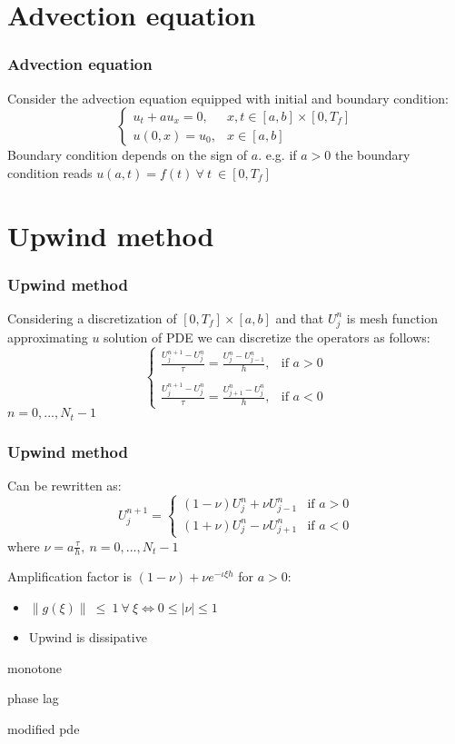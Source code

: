 \documentclass{beamer}
\begin{document}
\section{Advection equation}
\begin{frame}
\frametitle{Advection equation}
Consider the advection equation equipped with initial and boundary condition:
$$
\begin{cases}
u_t + a u_x = 0, & x,t \in [a,b] \times [0,T_f] \\
u(0,x) = u_0, & x \in [a,b]
\end{cases}
$$
Boundary condition depends on the sign of $a$. e.g. if $a > 0$ the boundary condition reads $u(a,t) = f(t) \ \forall \ t \ \in [0,T_f]$
\end{frame}
\section{Upwind method}
\begin{frame}
\frametitle{Upwind method}
Considering a discretization of $[0,T_f] \times [a,b]$ and that $U_j^n$ is mesh function approximating $u$ solution of PDE we can discretize the operators as follows:
\[
\begin{cases}
\displaystyle{\frac{U_j^{n+1} - U_j^n}{\tau} = \frac{U_j^n - U_{j-1}^n}{h}}, & \text{if } a > 0 \\ 
\\
\displaystyle{\frac{U_j^{n+1} - U_j^n}{\tau} = \frac{U_{j+1}^n - U_j^n}{h}}, & \text{if } a < 0
\end{cases}
\]
$n = 0, ..., N_t - 1$
\end{frame}
\begin{frame}
\frametitle{Upwind method}
Can be rewritten as:
\[
U_j^{n+1} =
\begin{cases}
(1 - \nu) U_j^n + \nu U_{j - 1}^n & \text{if } a > 0 \\
(1 + \nu) U_j^n - \nu U_{j + 1}^n & \text{if } a < 0
\end{cases}
\]
where $\nu = a \displaystyle{\frac{\tau}{h}}, \ n = 0, ..., N_t - 1$
\end{frame}
\begin{frame}
Amplification factor is $(1 - \nu) + \nu e^{-\iota \xi h}$ for $a > 0$:
\begin{itemize}
\item $ \|g(\xi)\| \ \leq \ 1 \ \forall \ \xi \iff  0 \leq |\nu| \leq 1$
\item Upwind is dissipative
\end{itemize}
\end{frame}
\begin{frame}
monotone
\end{frame}
\begin{frame}
phase lag
\end{frame}
\begin{frame}
modified pde
\end{frame}
\end{document}
